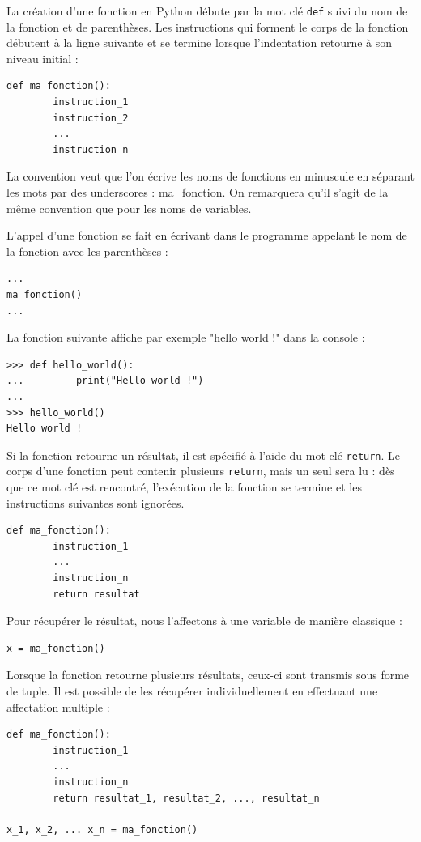 \documentclass[12pt, a4paper]{article}
\begin{document}
La création d'une fonction en Python débute par la mot clé \lstinline{def} suivi du nom de la fonction et de parenthèses. Les instructions qui forment le corps de la fonction débutent à la ligne suivante et se termine lorsque l'indentation retourne à son niveau initial :
\begin{lstlisting}
def ma_fonction():
		instruction_1
		instruction_2
		...
		instruction_n
\end{lstlisting}

La convention veut que l'on écrive les noms de fonctions en minuscule en séparant les mots par des underscores : ma\_fonction. On remarquera qu'il s'agit de la même convention que pour les noms de variables.

L'appel d'une fonction se fait en écrivant dans le programme appelant le nom de la fonction avec les parenthèses : 
\begin{lstlisting}
...
ma_fonction()
...
\end{lstlisting}

La fonction suivante affiche par exemple "hello world !" dans la console :
\begin{lstlisting}
>>> def hello_world():
...			print("Hello world !")
...
>>> hello_world()
Hello world !
\end{lstlisting}

Si la fonction retourne un résultat, il est spécifié à l'aide du mot-clé \lstinline{return}. Le corps d'une fonction peut contenir plusieurs \lstinline{return}, mais un seul sera lu : dès que ce mot clé est rencontré, l'exécution de la fonction se termine et les instructions suivantes sont ignorées.
\begin{lstlisting}
def ma_fonction():
		instruction_1
		...
		instruction_n
		return resultat
\end{lstlisting}

Pour récupérer le résultat, nous l'affectons à une variable de manière classique :
\begin{lstlisting}
x = ma_fonction()
\end{lstlisting}

Lorsque la fonction retourne plusieurs résultats, ceux-ci sont transmis sous forme de tuple. Il est possible de les récupérer individuellement en effectuant une affectation multiple :
\begin{lstlisting}
def ma_fonction():
		instruction_1
		...
		instruction_n
		return resultat_1, resultat_2, ..., resultat_n
		
x_1, x_2, ... x_n = ma_fonction()
\end{lstlisting}
\end{document}
